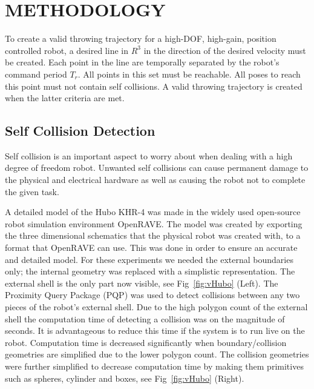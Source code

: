 \section{METHODOLOGY}\label{sec:methodology}
To create a valid throwing trajectory for a high-DOF, high-gain, position controlled robot, a desired line in $R^3$ in the direction of the desired velocity must be created.  Each point in the line are temporally separated by the robot's command period $T_r$.  All points in this set must be reachable.  All poses to reach this point must not contain self collisions.  A valid throwing trajectory is created when the latter criteria are met.

\subsection{Self Collision Detection}\label{sec:selfCollision}
Self collision is an important aspect to worry about when dealing with a high degree of freedom robot.  Unwanted self collisions can cause permanent damage to the physical and electrical hardware as well as causing the robot not to complete the given task.

A detailed model of the Hubo KHR-4 was made in the widely used open-source robot simulation environment OpenRAVE\cite{diankovThesis}.  The model was created by exporting the three dimensional schematics that the physical robot was created with, to a format that OpenRAVE can use.  This was done in order to ensure an accurate and detailed model.  For these experiments we needed the external boundaries only; the internal geometry was replaced with a simplistic representation.  The external shell is the only part now visible, see Fig~\ref{fig:vHubo} (Left).  The Proximity Query Package (PQP) was used to detect collisions between any two pieces of the robot's external shell.  Due to the high polygon count of the external shell the computation time of detecting a collision was on the magnitude of seconds.  It is advantageous to reduce this time if the system is to run live on the robot.  Computation time is decreased significantly when boundary/collision geometries are simplified due to the lower polygon count.  The collision geometries were further simplified to decrease computation time by making them primitives such as spheres, cylinder and boxes, see Fig~\ref{fig:vHubo} (Right). 

